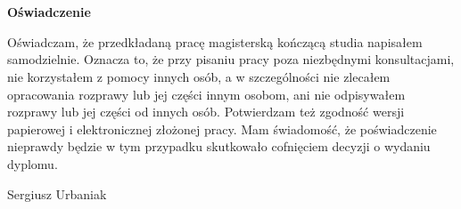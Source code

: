 \chapter*{}

\vspace{1 cm}
\begin{center}                        
\LARGE{ \bf{Oświadczenie}} \\
\end{center}
Oświadczam, że przedkładaną pracę magisterską kończącą studia napisałem samodzielnie. Oznacza to, że przy pisaniu pracy poza niezbędnymi konsultacjami, nie korzystałem z pomocy innych osób, a w szczególności nie zlecałem opracowania rozprawy lub jej części innym osobom, ani nie odpisywałem rozprawy lub jej części od innych osób.
Potwierdzam też zgodność wersji papierowej i elektronicznej złożonej pracy. Mam świadomość, że poświadczenie nieprawdy będzie w tym przypadku skutkowało cofnięciem decyzji o wydaniu dyplomu.
\vspace{3.0cm}
\begin{flushleft}
\hspace{10.0 cm}     Sergiusz Urbaniak\\
\end{flushleft}

\normalsize
